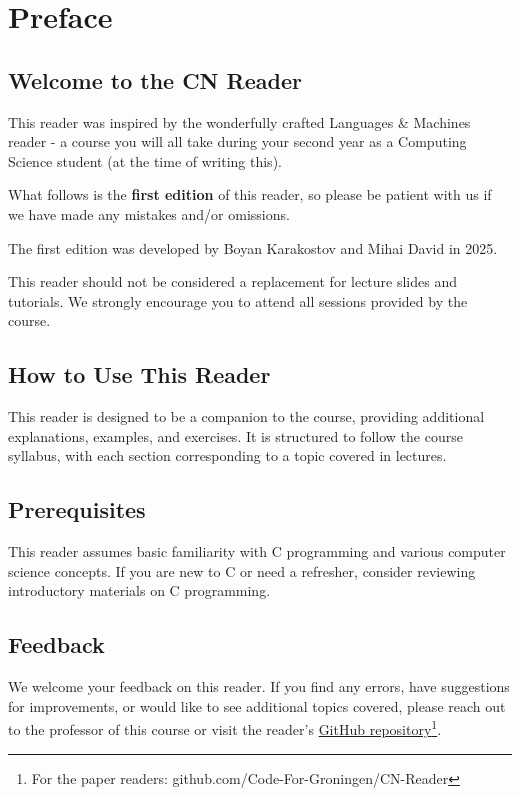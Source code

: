 \chapter{Preface}
\section*{Welcome to the CN Reader}
This reader was inspired by the wonderfully crafted Languages \& Machines reader - a course you will all take during your second year as a Computing Science student (at the time of writing this).

What follows is the \textbf{first edition} of this reader, so please be patient with us if we have made any mistakes and/or omissions.

The first edition was developed by Boyan Karakostov and Mihai David in 2025.

\begin{warningblock}
This reader should not be considered a replacement for lecture slides and tutorials. We strongly encourage you to attend all sessions provided by the course.
\end{warningblock}

\section*{How to Use This Reader}
This reader is designed to be a companion to the course, providing additional explanations, examples, and exercises. It is structured to follow the course syllabus, with each section corresponding to a topic covered in lectures.

\section*{Prerequisites}
This reader assumes basic familiarity with C programming and various computer science concepts. If you are new to C or need a refresher, consider reviewing introductory materials on C programming.

\section*{Feedback}
We welcome your feedback on this reader. If you find any errors, have suggestions for improvements, or would like to see additional topics covered, please reach out to the professor of this course or visit the reader's \href{https://github.com/Code-For-Groningen/CN-Reader}{GitHub repository}\footnote{For the paper readers: github.com/Code-For-Groningen/CN-Reader}.


